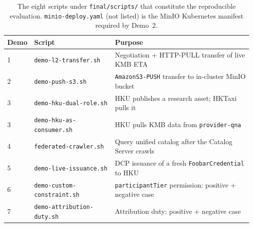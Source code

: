 \documentclass[11pt,a4paper]{article}
\DeclareRobustCommand{\code}[1]{\texttt{\small #1}}
\begin{document}
\begin{table}[ht]
\small
\caption{The eight scripts under \code{final/scripts/} that constitute
the reproducible evaluation. \code{minio-deploy.yaml} (not listed) is
the MinIO Kubernetes manifest required by Demo~2.}
\begin{tabularx}{\linewidth}{@{}l l X@{}}
\toprule
\textbf{Demo} & \textbf{Script} & \textbf{Purpose} \\
\midrule
1 & \code{demo-l2-transfer.sh}        & Negotiation + HTTP-PULL transfer of live KMB ETA \\
2 & \code{demo-push-s3.sh}            & \code{AmazonS3-PUSH} transfer to in-cluster MinIO bucket \\
3 & \code{demo-hku-dual-role.sh}      & HKU publishes a research asset; HKTaxi pulls it \\
3 & \code{demo-hku-as-consumer.sh}    & HKU pulls KMB data from \code{provider-qna} \\
4 & \code{federated-crawler.sh}       & Query unified catalog after the Catalog Server crawls \\
5 & \code{demo-live-issuance.sh}      & DCP issuance of a fresh \code{FoobarCredential} to HKU \\
6 & \code{demo-custom-constraint.sh}  & \code{participantTier} permission: positive + negative case \\
7 & \code{demo-attribution-duty.sh}   & Attribution duty: positive + negative case \\
\bottomrule
\end{tabularx}
\end{table}
\end{document}

